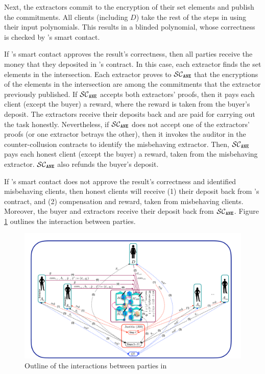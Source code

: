 %
Next, the extractors commit to the encryption of their set elements and publish the commitments. 
%
All clients (including $D$) take the rest of the steps in \fpsi using their input polynomials. This results in a blinded polynomial,  whose correctness is checked by \fpsi's smart contact. 

If  \fpsi's smart contact approves the result's correctness, then all parties receive the money that they deposited in \fpsi's contract. In this case, each extractor finds the set elements in the intersection. Each extractor proves to $\mathcal{SC}_{\mathtt{ANE}}$ that the encryptions of the elements in the intersection are among the commitments that the extractor previously published. 
%
If $\mathcal{SC}_{\mathtt{ANE}}$ accepts both extractors' proofs, then it pays each client (except the buyer) a reward, where the reward is taken from the buyer's deposit. The extractors receive their deposits back and are paid for carrying out the task honestly. Nevertheless, if $\mathcal{SC}_{\mathtt{ANE}}$ does not accept one of the extractors' proofs (or one extractor betrays the other), then it invokes the auditor in the counter-collusion contracts to identify the misbehaving extractor.  Then, $\mathcal{SC}_{\mathtt{ANE}}$ pays each honest client (except the buyer) a reward, taken from the misbehaving extractor. $\mathcal{SC}_{\mathtt{ANE}}$ also refunds the buyer's deposit.
%

If  \fpsi's smart contact does not approve the result's correctness and \aud identified misbehaving clients, then honest clients will receive (1) their deposit back from \fpsi's contract, and (2)  compensation and reward, taken from misbehaving clients. Moreover, the buyer and extractors receive their deposit back from $\mathcal{SC}_{\mathtt{ANE}}$. Figure \ref{fig:parties-interactions-in-ANE} outlines the interaction between parties. 


\begin{figure}[htp]
    \centering
    \includegraphics[width=12cm]{Diag-2.pdf}
    \caption{Outline of the interactions between parties in \withRew}\label{fig:parties-interactions-in-ANE}
\end{figure}











